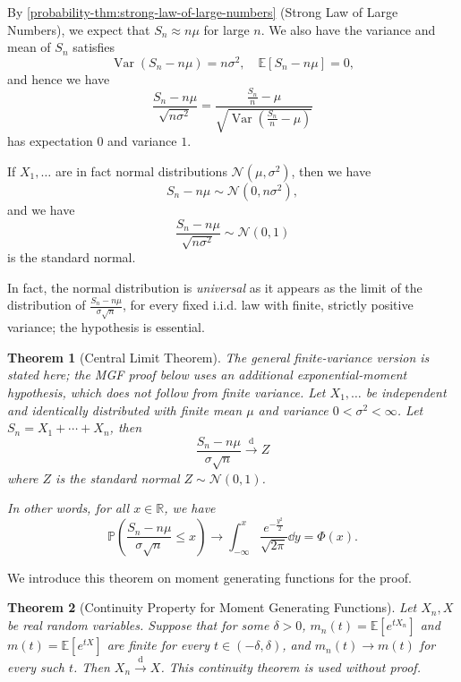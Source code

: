 \documentclass[11pt]{article}
\numberwithin{equation}{section}
\newtheorem{theorem}{Theorem}[section]
\theoremstyle{definition}
\theoremstyle{remark}
\newcommand{\pqty}[1]{\left(#1\right)}
\newcommand{\bqty}[1]{\left[#1\right]}
\newcommand{\flatfrac}[2]{\frac{#1}{#2}}
\newcommand{\RR}{\mathbb R}
\newcommand{\minusinfty}{-\infty}
\newcommand{\Prob}{\mathbb P}
\newcommand{\Expt}{\mathbb E}
\DeclareMathOperator{\Var}{Var}
\newcommand{\sNormCdf}{\Phi}
\newcommand{\toDist}{\xrightarrow{\mathrm d}}
\newcommand{\Normal}{\mathcal N}
\begin{document}
By \autoref{probability-thm:strong-law-of-large-numbers} (Strong Law of Large Numbers), we expect that \(S_n \approx n \mu\) for large \(n\). We also have the variance and mean of \(S_n\) satisfies
\[
    \Var\pqty{S_n - n \mu} = n \sigma^2, \quad \Expt\bqty{S_n - n \mu} = 0,
\]
and hence we have
\[
    \frac{S_n - n \mu}{\sqrt{n \sigma^2}} = \frac{\frac{S_n}{n} - \mu}{\sqrt{\Var\pqty{\frac{S_n}{n} - \mu}}}
\]
has expectation \(0\) and variance \(1\).

If \(X_1, \ldots\) are in fact normal distributions \(\Normal\pqty{\mu, \sigma^2}\), then we have
\[
    S_n - n \mu \sim \Normal\pqty{0, n \sigma^2},
\]
and we have
\[
    \frac{S_n - n \mu}{\sqrt{n \sigma^2}} \sim \Normal\pqty{0, 1}
\]
is the standard normal.

In fact, the normal distribution is \emph{universal} as it appears as the limit of the distribution of \(\frac{S_n - n \mu}{\sigma \sqrt{n}}\), for every fixed i.i.d. law with finite, strictly positive variance; the hypothesis is essential.

\begin{theorem}[Central Limit Theorem]\label{probability-theorem-027}
    \label{probability-thm:clt}
The general finite-variance version is stated here; the MGF proof below uses an additional exponential-moment hypothesis, which does not follow from finite variance.
%
    Let \(X_1, \ldots\) be independent and identically distributed with finite mean \(\mu\) and variance \(0<\sigma^2<\infty\). Let \(S_n = X_1 + \cdots + X_n\), then
    \[
        \frac{S_n - n \mu}{\sigma \sqrt{n}} \toDist Z
    \]
    where \(Z\) is the standard normal \(Z \sim \Normal\pqty{0, 1}\).

    In other words, for all \(x \in \RR\), we have
    \[
        \Prob\pqty{\frac{S_n - n \mu}{\sigma \sqrt{n}} \leq x} \to \int_{\minusinfty}^{x}  \frac{e^{- \flatfrac{y^2}{2}}}{\sqrt{2 \pi}} \dd{y} = \sNormCdf\pqty{x}.
    \]
\end{theorem}

We introduce this theorem on moment generating functions for the proof.

\begin{theorem}[Continuity Property for Moment Generating Functions]\label{probability-theorem-028}
    \label{probability-thm:continuity-property-mgf}
Let \(X_n,X\) be real random variables. Suppose that for some \(\delta>0\),
\(m_n(t)=\Expt[e^{tX_n}]\) and \(m(t)=\Expt[e^{tX}]\) are finite for every
\(t\in(-\delta,\delta)\), and \(m_n(t)\to m(t)\) for every such \(t\).
Then \(X_n\toDist X\). This continuity theorem is used without proof.
\end{theorem}
\end{document}
